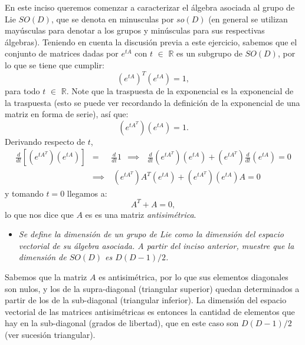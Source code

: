 En este inciso queremos comenzar a caracterizar el álgebra asociada al grupo de Lie $SO(D)$, que se denota en minusculas por $so(D)$ (en general se utilizan mayúsculas para denotar a los grupos y minúsculas para sus respectivas álgebras). Teniendo en cuenta la discusión previa a este ejercicio, sabemos que el conjunto de matrices dadas por $e^{tA}$ con $t$ $\in$ $\mathbb{R}$ es un subgrupo de $SO(D)$, por lo que se tiene que cumplir:
\begin{equation}
    \left(e^{tA}\right)^{T} \left(e^{tA}\right)=1,
\end{equation}
para todo $t$ $\in$ $\mathbb{R}$. Note que la traspuesta de la exponencial es la exponencial de la traspuesta (esto se puede ver recordando la definición de la exponencial de una matriz en forma de serie), así que:
\begin{equation}
    \left(e^{tA^{T}}\right) \left(e^{tA}\right)=1.
\end{equation}
Derivando respecto de $t$,
\begin{eqnarray*}
\frac{d}{dt}\left[ \left( e^{tA^{T}}\right) \left( e^{tA}\right) \right]  &=&
\frac{d}{dt} 1 ~\ \implies ~\ \ \frac{d}{dt}\left( e^{tA^{T}}\right)
\left( e^{tA}\right) +\left( e^{tA^{T}}\right) \frac{d}{dt}\left(
e^{tA}\right) =0 \\
&\mathbb{\implies }&\mathbb{~}\left( e^{tA^{T}}\right) A^{T}\left(
e^{tA}\right) +\left( e^{tA^{T}}\right) \left( e^{tA}\right) A=0
\end{eqnarray*}
y tomando $t = 0$ llegamos a:
\begin{equation}
A^{T}+A=0,
\end{equation}
lo que nos dice que $A$ es es una matriz \emph{antisimétrica}.
\vspace{0.2cm}
\begin{itemize}
    \item \emph{Se define la dimensión de un grupo de Lie como la dimensión del espacio vectorial de su álgebra asociada. A partir del inciso anterior, muestre que la dimensión de $SO(D)$ es $D(D-1)/2$.}
\end{itemize}
\vspace{0.2cm}
Sabemos que la matriz $A$ es antisimétrica, por lo que sus elementos diagonales son nulos, y los de la supra-diagonal (triangular superior) quedan determinados a partir de los de la sub-diagonal (triangular inferior). La dimensión del espacio vectorial de las matrices antisimétricas es entonces la cantidad de elementos que hay en la sub-diagonal (grados de libertad), que en este caso son $D(D-1)/2$ (ver sucesión triangular).
\vspace{0.2cm}

